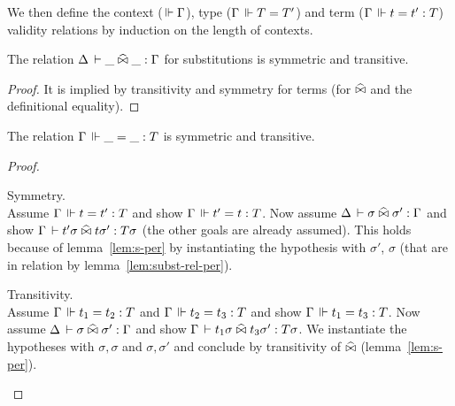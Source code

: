 \documentclass[a4paper,english]{lipics-utf8x}
\begin{document}
  We then define the context ($\,\Vdash \Gamma$), type ($\Gamma \,\Vdash T = T'$) and
  term ($\Gamma \,\Vdash t = t' : T$) validity relations by induction on the length
  of contexts.

  \begin{mathc}
    \ru{}{\Der \cdot}
    \qquad
    \qquad
    \qquad
  \end{mathc}

  \begin{mathc}
    \qquad
  \end{mathc}

  \begin{lemma}
    \label{lem:subst-rel-per}
    The relation $\Delta \,\vdash \_ \mathrel{\widehat{\bowtie}} \_ : \Gamma$ for substitutions
    is symmetric and transitive.
  \end{lemma}

  \begin{proof}
    It is implied by transitivity and symmetry for terms (for $\mathrel{\widehat{\bowtie}}$ and the
    definitional equality).
  \end{proof}

  \begin{lemma}
    The relation $\Gamma \,\Vdash \_ = \_ : T$ is symmetric and transitive.
  \end{lemma}

  \begin{proof}
    \leavevmode
    \begin{caselist}
      \nextcase Symmetry.\\
      Assume $\Gamma \,\Vdash t = t' : T$ and show $\Gamma \,\Vdash t' = t : T$.
      Now assume $\Delta \,\vdash \sigma \mathrel{\widehat{\bowtie}} \sigma' : \Gamma$ and show
      $\Gamma \,\vdash t' \sigma \mathrel{\widehat{\bowtie}} t \sigma' : T \sigma$ (the other goals are
      already assumed). This holds because of lemma~\ref{lem:s-per} by
      instantiating the hypothesis with $\sigma'$, $\sigma$ (that are in
      relation by lemma~\ref{lem:subst-rel-per}).

      \nextcase Transitivity.\\
      Assume $\Gamma \,\Vdash t_1 = t_2 : T$ and $\Gamma \,\Vdash t_2 = t_3 : T$ and
      show $\Gamma \,\Vdash t_1 = t_3 : T$.
      Now assume $\Delta \,\vdash \sigma \mathrel{\widehat{\bowtie}} \sigma' : \Gamma$ and show
      $\Gamma \,\vdash t_1 \sigma \mathrel{\widehat{\bowtie}} t_3 \sigma' : T \sigma$.
      We instantiate the hypotheses with $\sigma,\sigma$ and $\sigma,\sigma'$
      and conclude by transitivity of $\mathrel{\widehat{\bowtie}}$ (lemma~\ref{lem:s-per}).
    \end{caselist}
  \end{proof}
\end{document}
